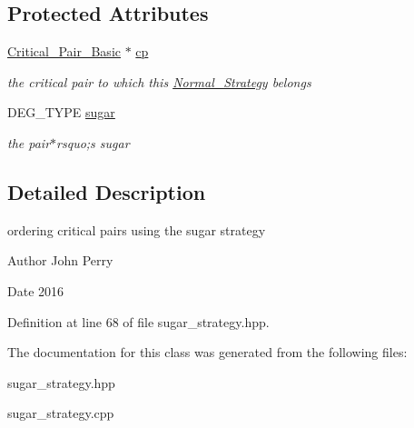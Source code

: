 \subsection*{Protected Attributes}
\begin{DoxyCompactItemize}
\item 
\mbox{\label{class_pair___sugar___data_a296c0a6eb2e16d5b7628ccf3df8f29c6}} 
\hyperlink{class_critical___pair___basic}{Critical\+\_\+\+Pair\+\_\+\+Basic} $\ast$ \hyperlink{class_pair___sugar___data_a296c0a6eb2e16d5b7628ccf3df8f29c6}{cp}
\begin{DoxyCompactList}\small\item\em the critical pair to which this {\ttfamily \hyperlink{class_normal___strategy}{Normal\+\_\+\+Strategy}} belongs \end{DoxyCompactList}\item 
\mbox{\label{class_pair___sugar___data_a8d743628b73ac3f4de3df1ec306263bb}} 
D\+E\+G\+\_\+\+T\+Y\+PE \hyperlink{class_pair___sugar___data_a8d743628b73ac3f4de3df1ec306263bb}{sugar}
\begin{DoxyCompactList}\small\item\em the pair$\ast$rsquo;s sugar \end{DoxyCompactList}\end{DoxyCompactItemize}


\subsection{Detailed Description}
ordering critical pairs using the sugar strategy 

\begin{DoxyAuthor}{Author}
John Perry 
\end{DoxyAuthor}
\begin{DoxyDate}{Date}
2016 
\end{DoxyDate}


Definition at line 68 of file sugar\+\_\+strategy.\+hpp.



The documentation for this class was generated from the following files\+:\begin{DoxyCompactItemize}
\item 
sugar\+\_\+strategy.\+hpp\item 
sugar\+\_\+strategy.\+cpp\end{DoxyCompactItemize}
